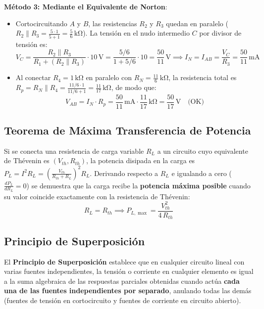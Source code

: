 \begin{ejemplo}
\textbf{Método 3: Mediante el Equivalente de Norton}:
\begin{itemize}
    \item Cortocircuitando $A$ y $B$, las resistencias $R_2$ y $R_3$ quedan en paralelo ($R_2 \parallel R_3 = \frac{5\cdot 1}{5+1} = \frac{5}{6}\,\si{\kilo\ohm}$). La tensión en el nudo intermedio $C$ por divisor de tensión es:
    \begin{equation*}
        V_C = \frac{R_2 \parallel R_3}{R_1 + (R_2 \parallel R_3)}\cdot 10\,\si{\volt} = \frac{5/6}{1 + 5/6}\cdot 10 = \frac{50}{11}\,\si{\volt} \implies I_N = I_{AB} = \frac{V_C}{R_3} = \frac{50}{11}\,\si{\milli\ampere}
    \end{equation*}
    \item Al conectar $R_4 = 1\,\si{\kilo\ohm}$ en paralelo con $R_N = \frac{11}{6}\,\si{\kilo\ohm}$, la resistencia total es $R_p = R_N \parallel R_4 = \frac{11/6 \cdot 1}{11/6 + 1} = \frac{11}{17}\,\si{\kilo\ohm}$, de modo que:
    \begin{equation*}
        \boxed{V_{AB} = I_N \cdot R_p = \frac{50}{11}\,\si{\milli\ampere} \cdot \frac{11}{17}\,\si{\kilo\ohm} = \frac{50}{17}\,\si{\volt}} \quad \text{(OK)}
    \end{equation*}
\end{itemize}
\end{ejemplo}

\subsection{Teorema de Máxima Transferencia de Potencia}
Si se conecta una resistencia de carga variable $R_L$ a un circuito cuyo equivalente de Thévenin es $(V_{th}, R_{th})$, la potencia disipada en la carga es $P_L = I^2 R_L = \left(\frac{V_{th}}{R_{th} + R_L}\right)^2 R_L$. Derivando respecto a $R_L$ e igualando a cero ($\frac{dP_L}{dR_L} = 0$) se demuestra que la carga recibe la \textbf{potencia máxima posible} cuando su valor coincide exactamente con la resistencia de Thévenin:
\begin{equation}
    \boxed{R_L = R_{th} \implies P_{L,\max} = \frac{V_{th}^2}{4\,R_{th}}}
\end{equation}

\subsection{Principio de Superposición}

El \textbf{Principio de Superposición} establece que en cualquier circuito lineal con varias fuentes independientes, la tensión o corriente en cualquier elemento es igual a la suma algebraica de las respuestas parciales obtenidas cuando actúa \textbf{cada una de las fuentes independientes por separado}, anulando todas las demás (fuentes de tensión en cortocircuito y fuentes de corriente en circuito abierto).

